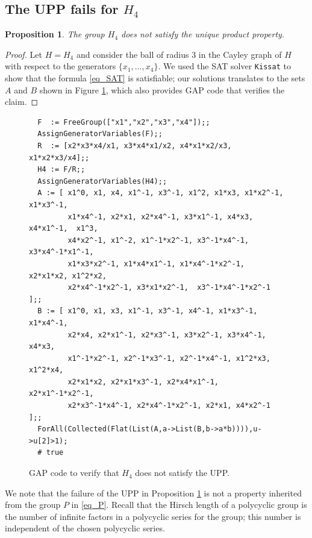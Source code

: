 \documentclass[11pt]{amsart}
\newcommand\textcode[1]{{\footnotesize \rm\texttt{#1}}}
\theoremstyle{mythm}
\newtheorem{proposition}[theorem]{Proposition}
\theoremstyle{mydef}
\theoremstyle{myrem}
\numberwithin{equation}{section}
\begin{document}
\subsection{The UPP fails for $H_4$}


\begin{proposition}\label{prop_H4upp} The group $H_4$ does not satisfy the unique product property.
\end{proposition}
\begin{proof}
  Let $H=H_4$ and consider the ball of radius $3$ in the Cayley graph of $H$ with respect to the generators $\{x_1,\ldots,x_4\}$. We used the SAT solver \textcode{Kissat} to show that the formula \eqref{eq_SAT} is satisfiable; our solutions translates to the sets $A$ and $B$ shown in Figure \ref{fig_G4}, which also provides GAP code that verifies the claim.
\end{proof}


\begin{figure}[h] 
\begin{verbatim} 
  F  := FreeGroup(["x1","x2","x3","x4"]);; 
  AssignGeneratorVariables(F);;
  R  := [x2*x3*x4/x1, x3*x4*x1/x2, x4*x1*x2/x3, x1*x2*x3/x4];;
  H4 := F/R;;
  AssignGeneratorVariables(H4);;
  A := [ x1^0, x1, x4, x1^-1, x3^-1, x1^2, x1*x3, x1*x2^-1, x1*x3^-1,
         x1*x4^-1, x2*x1, x2*x4^-1, x3*x1^-1, x4*x3, x4*x1^-1,  x1^3,
         x4*x2^-1, x1^-2, x1^-1*x2^-1, x3^-1*x4^-1, x3*x4^-1*x1^-1,
         x1*x3*x2^-1, x1*x4*x1^-1, x1*x4^-1*x2^-1, x2*x1*x2, x1^2*x2,
         x2*x4^-1*x2^-1, x3*x1*x2^-1,  x3^-1*x4^-1*x2^-1 ];;
  B := [ x1^0, x1, x3, x1^-1, x3^-1, x4^-1, x1*x3^-1, x1*x4^-1, 
         x2*x4, x2*x1^-1, x2*x3^-1, x3*x2^-1, x3*x4^-1, x4*x3, 
         x1^-1*x2^-1, x2^-1*x3^-1, x2^-1*x4^-1, x1^2*x3, x1^2*x4,
         x2*x1*x2, x2*x1*x3^-1, x2*x4*x1^-1, x2*x1^-1*x2^-1,
         x2*x3^-1*x4^-1, x2*x4^-1*x2^-1, x2*x1, x4*x2^-1 ];;
  ForAll(Collected(Flat(List(A,a->List(B,b->a*b)))),u->u[2]>1);
  # true
\end{verbatim}
\caption{GAP code to verify that $H_4$ does not satisfy the UPP.}\label{fig_G4}
\end{figure}




 We note that the failure of the UPP in Proposition \ref{prop_H4upp} is not a property  inherited from the group $P$ in \eqref{eq_P}. Recall that the Hirsch length of a polycyclic group is the number of infinite factors in a polycyclic series for the group; this number is independent of the chosen polycyclic series.
\end{document}
